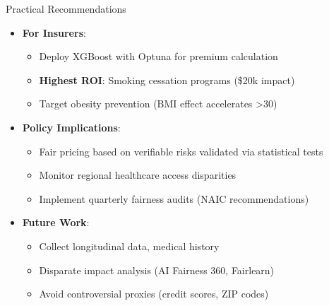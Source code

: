 \documentclass[10pt]{beamer}
\begin{document}
\begin{frame}{Practical Recommendations}
\begin{itemize}
\item \textbf{For Insurers}:
  \begin{itemize}
  \item Deploy XGBoost with Optuna for premium calculation
  \item \textbf{Highest ROI}: Smoking cessation programs (\$20k impact)
  \item Target obesity prevention (BMI effect accelerates >30)
  \end{itemize}
\item \textbf{Policy Implications}:
  \begin{itemize}
  \item Fair pricing based on verifiable risks validated via statistical tests
  \item Monitor regional healthcare access disparities
  \item Implement quarterly fairness audits (NAIC recommendations)
  \end{itemize}
\item \textbf{Future Work}:
  \begin{itemize}
  \item Collect longitudinal data, medical history
  \item Disparate impact analysis (AI Fairness 360, Fairlearn)
  \item Avoid controversial proxies (credit scores, ZIP codes)
  \end{itemize}
\end{itemize}
\end{frame}
\end{document}
